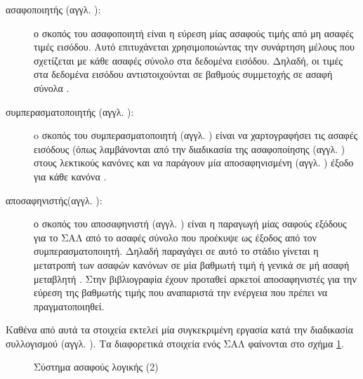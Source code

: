 \documentclass{assignment}
\begin{document}
\begin{description}
\item[ασαφοποιητής (αγγλ. ): ] ο σκοπός του ασαφοποιητή είναι η εύρεση μίας ασαφούς τιμής από μη ασαφές τιμές εισόδου. Αυτό επιτυχάνεται χρησιμοποιώντας την συνάρτηση μέλους που σχετίζεται με κάθε ασαφές σύνολο στα δεδομένα εισόδου. Δηλαδή, οι τιμές στα δεδομένα εισόδου αντιστοιχούνται σε βαθμούς συμμετοχής σε ασαφή σύνολα \cite{engelbrecht}.

\item [συμπερασματοποιητής (αγγλ. ): ] o σκοπός του συμπερασματοποιητή (αγγλ. ) είναι να χαρτογραφήσει τις ασαφές εισόδους (όπως λαμβάνονται από την διαδικασία της ασαφοποίησης (αγγλ. ) στους λεκτικούς κανόνες και να παράγουν μία αποσαφηνισμένη (αγγλ. ) έξοδο για κάθε κανόνα \cite{engelbrecht}.

\item [αποσαφηνιστής(αγγλ. ): ] ο σκοπός του αποσαφηνιστή (αγγλ. ) είναι η παραγωγή μίας σαφούς εξόδους για το ΣΑΛ από το ασαφές σύνολο που προέκυψε ως έξοδος από τον συμπερασματοποιητή. Δηλαδή παραγάγει σε αυτό το στάδιο γίνεται η μετατροπή των ασαφών κανόνων σε μία βαθμωτή τιμή ή γενικά σε μή ασαφή μεταβλητή \cite{class_notes,engelbrecht}. Στην βιβλιογραφία έχουν προταθεί αρκετοί αποσαφηνιστές για την εύρεση της βαθμωτής τιμής που αναπαριστά την ενέργεια που πρέπει να πραγματοποιηθεί.
\end{description}

Καθένα από αυτά τα στοιχεία εκτελεί μία συγκεκριμένη εργασία κατά την διαδικασία συλλογισμού (αγγλ. ). Τα διαφορετικά στοιχεία ενός ΣΑΛ φαίνονται στο σχήμα \ref{fig:fuzzy_logic_system_2}.

\begin{figure}
\begin{center}
\caption{Σύστημα ασαφούς λογικής (2) \cite{engelbrecht}}
\label{fig:fuzzy_logic_system_2}
\end{center}
\end{figure}
\end{document}
